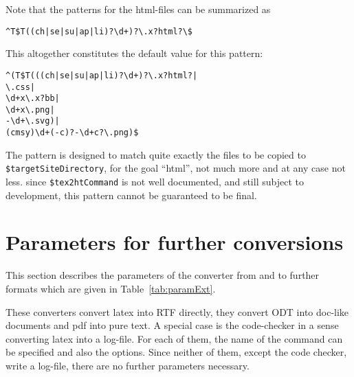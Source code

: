 Note that the patterns for the html-files can be summarized as 
%
\begin{Verbatim}
^T$T((ch|se|su|ap|li)?\d+)?\.x?html?\$
\end{Verbatim}

This altogether constitutes the default value for this pattern: 
%
\begin{verbatim}
^(T$T(((ch|se|su|ap|li)?\d+)?\.x?html?|
\.css|
\d+x\.x?bb|
\d+x\.png|
-\d+\.svg)|
(cmsy)\d+(-c)?-\d+c?\.png)$
\end{verbatim}

The pattern is designed to match quite exactly 
the files to be copied to \texttt{\$targetSiteDirectory}, 
for the goal ``html'', 
not much more and at any case not less. 
since \texttt{\$tex2htCommand} is not well documented, 
and still subject to development, 
this pattern cannot be guaranteed to be final. 


\section{Parameters for further conversions}\label{sec:settingsExt}

This section describes the parameters 
of the converter from and to further formats 
which are given in Table~\ref{tab:paramExt}. 

These converters convert latex into RTF directly, 
they convert ODT into doc-like documents and pdf into pure text. 
A special case is the code-checker 
in a sense converting latex into a log-file. 
For each of them, the name of the command can be specified 
and also the options. 
Since neither of them, except the code checker, write a log-file, 
there are no further parameters necessary. 



